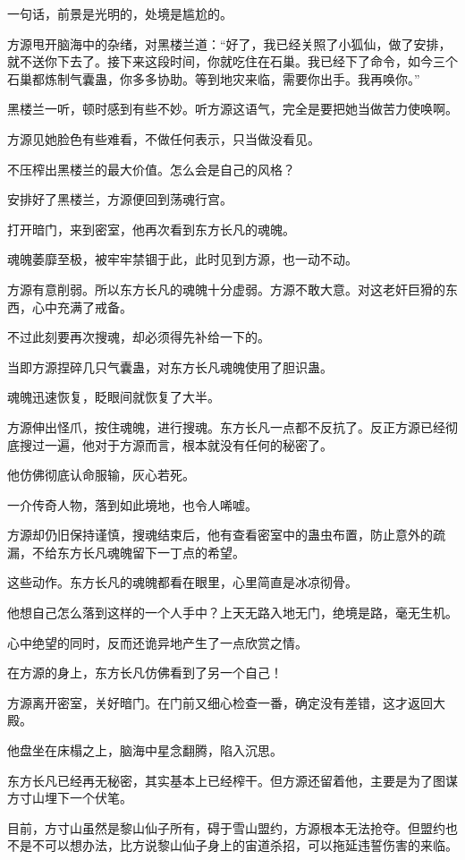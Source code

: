 \begin{this_body}
一句话，前景是光明的，处境是尴尬的。

方源甩开脑海中的杂绪，对黑楼兰道：“好了，我已经关照了小狐仙，做了安排，就不送你下去了。接下来这段时间，你就吃住在石巢。我已经下了命令，如今三个石巢都炼制气囊蛊，你多多协助。等到地灾来临，需要你出手。我再唤你。”

黑楼兰一听，顿时感到有些不妙。听方源这语气，完全是要把她当做苦力使唤啊。

方源见她脸色有些难看，不做任何表示，只当做没看见。

不压榨出黑楼兰的最大价值。怎么会是自己的风格？

安排好了黑楼兰，方源便回到荡魂行宫。

打开暗门，来到密室，他再次看到东方长凡的魂魄。

魂魄萎靡至极，被牢牢禁锢于此，此时见到方源，也一动不动。

方源有意削弱。所以东方长凡的魂魄十分虚弱。方源不敢大意。对这老奸巨猾的东西，心中充满了戒备。

不过此刻要再次搜魂，却必须得先补给一下的。

当即方源捏碎几只气囊蛊，对东方长凡魂魄使用了胆识蛊。

魂魄迅速恢复，眨眼间就恢复了大半。

方源伸出怪爪，按住魂魄，进行搜魂。东方长凡一点都不反抗了。反正方源已经彻底搜过一遍，他对于方源而言，根本就没有任何的秘密了。

他仿佛彻底认命服输，灰心若死。

一介传奇人物，落到如此境地，也令人唏嘘。

方源却仍旧保持谨慎，搜魂结束后，他有查看密室中的蛊虫布置，防止意外的疏漏，不给东方长凡魂魄留下一丁点的希望。

这些动作。东方长凡的魂魄都看在眼里，心里简直是冰凉彻骨。

他想自己怎么落到这样的一个人手中？上天无路入地无门，绝境是路，毫无生机。

心中绝望的同时，反而还诡异地产生了一点欣赏之情。

在方源的身上，东方长凡仿佛看到了另一个自己！

方源离开密室，关好暗门。在门前又细心检查一番，确定没有差错，这才返回大殿。

他盘坐在床榻之上，脑海中星念翻腾，陷入沉思。

东方长凡已经再无秘密，其实基本上已经榨干。但方源还留着他，主要是为了图谋方寸山埋下一个伏笔。

目前，方寸山虽然是黎山仙子所有，碍于雪山盟约，方源根本无法抢夺。但盟约也不是不可以想办法，比方说黎山仙子身上的宙道杀招，可以拖延违誓伤害的来临。


\end{this_body}
